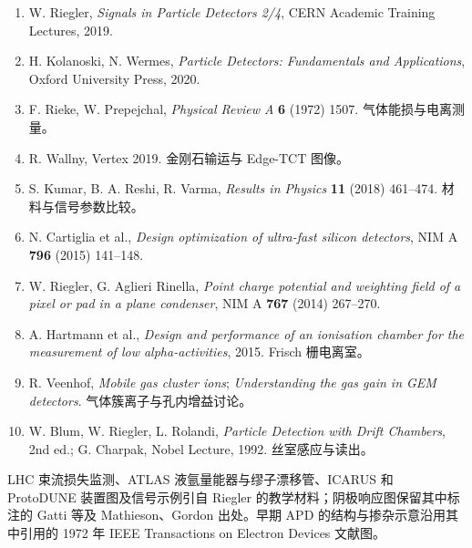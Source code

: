 \documentclass[
  11pt,
  a4paper,
  oneside,
  openany]{report}
\providecommand{\tightlist}{%
  \setlength{\itemsep}{0pt}\setlength{\parskip}{0pt}}
\numberwithin{equation}{chapter}
\begin{document}
\begin{enumerate}
\def\labelenumi{\arabic{enumi}.}
\tightlist
\item
  W. Riegler, \emph{Signals in Particle Detectors 2/4}, CERN Academic
  Training Lectures, 2019.
\item
  H. Kolanoski, N. Wermes, \emph{Particle Detectors: Fundamentals and
  Applications}, Oxford University Press, 2020.
\item
  F. Rieke, W. Prepejchal, \emph{Physical Review A} \textbf{6} (1972)
  1507. 气体能损与电离测量。
\item
  R. Wallny, Vertex 2019. 金刚石输运与 Edge-TCT 图像。
\item
  S. Kumar, B. A. Reshi, R. Varma, \emph{Results in Physics} \textbf{11}
  (2018) 461--474. 材料与信号参数比较。
\item
  N. Cartiglia et al., \emph{Design optimization of ultra-fast silicon
  detectors}, NIM A \textbf{796} (2015) 141--148.
\item
  W. Riegler, G. Aglieri Rinella, \emph{Point charge potential and
  weighting field of a pixel or pad in a plane condenser}, NIM A
  \textbf{767} (2014) 267--270.
\item
  A. Hartmann et al., \emph{Design and performance of an ionisation
  chamber for the measurement of low alpha-activities}, 2015. Frisch
  栅电离室。
\item
  R. Veenhof, \emph{Mobile gas cluster ions}; \emph{Understanding the
  gas gain in GEM detectors}. 气体簇离子与孔内增益讨论。
\item
  W. Blum, W. Riegler, L. Rolandi, \emph{Particle Detection with Drift
  Chambers}, 2nd ed.; G. Charpak, Nobel Lecture, 1992. 丝室感应与读出。
\end{enumerate}

LHC 束流损失监测、ATLAS 液氩量能器与缪子漂移管、ICARUS 和 ProtoDUNE
装置图及信号示例引自 Riegler 的教学材料；阴极响应图保留其中标注的 Gatti
等及 Mathieson、Gordon 出处。早期 APD 的结构与掺杂示意沿用其中引用的
1972 年 IEEE Transactions on Electron Devices 文献图。
\end{document}
